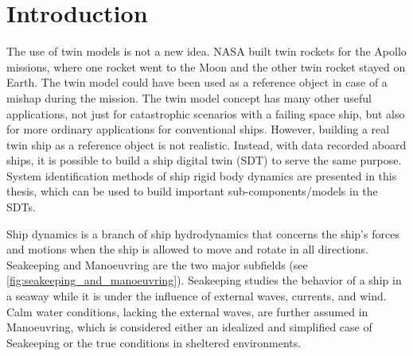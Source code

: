 \chapter{Introduction}
The use of twin models is not a new idea. NASA built twin rockets for the Apollo missions, where one rocket went to the Moon and the other twin rocket stayed on Earth.
The twin model could have been used as a reference object in case of a mishap during the mission.  
The twin model concept has many other useful applications, not just for catastrophic scenarios with a failing space ship, but also for more ordinary applications for conventional ships. However, building a real twin ship as a reference object is not realistic. Instead, with data recorded aboard ships, it is possible to build a ship digital twin (SDT) to serve the same purpose.
System identification methods of ship rigid body dynamics are presented in this thesis, which can be used to build important sub-components/models in the SDTs. 

Ship dynamics is a branch of ship hydrodynamics that concerns the ship's forces and motions when the ship is allowed to move and rotate in all directions. Seakeeping and Manoeuvring are the two major subfields (see \autoref{fig:seakeeping_and_manoeuvring}). Seakeeping studies the  behavior of a ship in a seaway while it is under the influence of external waves, currents, and wind. Calm water conditions, lacking the external waves, are further assumed in Manoeuvring, which is considered either an idealized and simplified case of Seakeeping or the true conditions in sheltered environments. 

